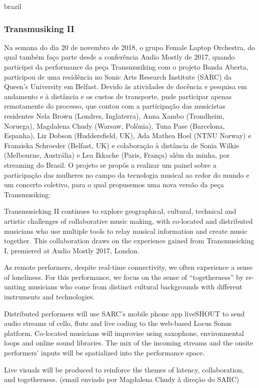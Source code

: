 \begin{otherlanguage*}{brazil}
\subsubsection{Transmusiking II}

Na semana do dia 20 de novembro de 2018, o grupo Female Laptop Orchestra, do qual também faço parte desde a conferência Audio Mostly de 2017, quando participei da performance da peça Transmusiking com o projeto Banda Aberta, participou de uma residência no Sonic Arts Research Institute (SARC) da Queen's University em Belfast. Devido ãs atividades de docência e pesquisa em andamento e à distância e os custos de transporte, pude participar apenas remotamente do processo, que contou com a participação das musicistas residentes Nela Brown (Londres, Inglaterra), Anna Xambo (Trondheim, Noruega), Magdalena Chudy (Warsaw, Polônia), Tuna Pase (Barcelona, Espanha), Liz Dobson (Huddersfield, UK), Ada Mathea Hoel (NTNU Norway) e Franziska Schroeder (Belfast, UK) e colaboração à distância de Sonia Wilkie (Melbourne, Austrália) e Lea Ikkache (Paris, França) além da minha, por streaming do Brasil. O projeto se propôs a realizar um painel sobre a participação das mulheres no campo da tecnologia musical ao redor do mundo e um concerto coletivo, para o qual propusemos uma nova versão da peça Transmusiking:


\begin{citacao}
Transmusicking II continues to explore geographical, cultural, technical and artistic challenges of collaborative music making, with co-located and distributed musicians who use multiple tools to relay musical information and create music together. This collaboration draws on the experience gained from Transmusicking I, premiered at Audio Mostly 2017, London.

As remote performers, despite real-time connectivity, we often experience a sense of loneliness. For this performance, we focus on the sense of “togetherness” by re-uniting musicians who come from distinct cultural backgrounds with different instruments and technologies. 

Distributed performers will use SARC’s mobile phone app liveSHOUT to send audio streams of cello, flute and live coding to the web-based Locus Sonus platform. Co-located musicians will improvise using saxophone, environmental loops and online sound libraries. 
The mix of the incoming streams and the onsite performers’ inputs will be spatialized into the performance space.

Live visuals will be produced to reinforce the themes of latency, collaboration, and togetherness. (email enviado por Magdalena Chudy à direção do SARC)
\end{citacao}


\end{otherlanguage*}
